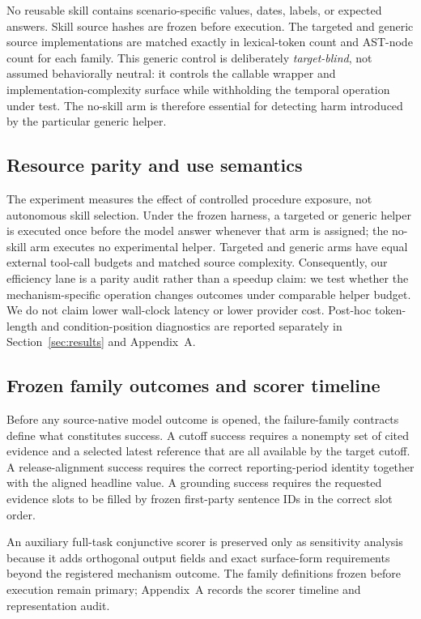 No reusable skill contains scenario-specific values, dates, labels, or expected answers. Skill source hashes are frozen before execution. The targeted and generic source implementations are matched exactly in lexical-token count and AST-node count for each family. This generic control is deliberately \emph{target-blind}, not assumed behaviorally neutral: it controls the callable wrapper and implementation-complexity surface while withholding the temporal operation under test. The no-skill arm is therefore essential for detecting harm introduced by the particular generic helper.

\subsection{Resource parity and use semantics}
The experiment measures the effect of controlled procedure exposure, not autonomous skill selection. Under the frozen harness, a targeted or generic helper is executed once before the model answer whenever that arm is assigned; the no-skill arm executes no experimental helper. Targeted and generic arms have equal external tool-call budgets and matched source complexity. Consequently, our efficiency lane is a parity audit rather than a speedup claim: we test whether the mechanism-specific operation changes outcomes under comparable helper budget. We do not claim lower wall-clock latency or lower provider cost. Post-hoc token-length and condition-position diagnostics are reported separately in Section~\ref{sec:results} and Appendix~A.

\subsection{Frozen family outcomes and scorer timeline}
Before any source-native model outcome is opened, the failure-family contracts define what constitutes success. A cutoff success requires a nonempty set of cited evidence and a selected latest reference that are all available by the target cutoff. A release-alignment success requires the correct reporting-period identity together with the aligned headline value. A grounding success requires the requested evidence slots to be filled by frozen first-party sentence IDs in the correct slot order.

An auxiliary full-task conjunctive scorer is preserved only as sensitivity analysis because it adds orthogonal output fields and exact surface-form requirements beyond the registered mechanism outcome. The family definitions frozen before execution remain primary; Appendix~A records the scorer timeline and representation audit.

